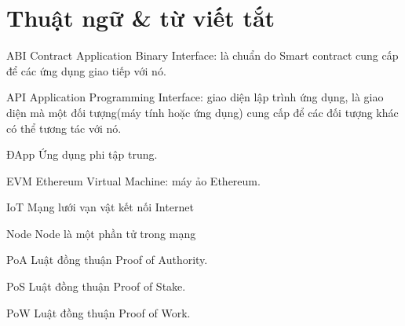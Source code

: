 \newcommand{\abbrlabel}[1]{\makebox[3cm][l]{\textbf{#1}\ \dotfill}}
\newenvironment{abbreviations}{\begin{list}{}{\renewcommand{\makelabel}{\abbrlabel}}}{\end{list}}

\chapter*{Thuật ngữ \& từ viết tắt}
\thispagestyle{empty}
\pagestyle{empty}
\vspace{1.0cm}
\begin{abbreviations}
	\item[ABI] Contract Application Binary Interface: là chuẩn do Smart contract cung cấp để các ứng dụng giao tiếp với nó.
    \item[API] Application Programming Interface: giao diện lập trình ứng dụng, là giao diện mà một đối tượng(máy tính hoặc ứng dụng) cung cấp để các đối tượng khác có thể tương tác với nó. 
    \item[ĐApp] Ứng dụng phi tập trung.
    \item[EVM] Ethereum Virtual Machine: máy ảo Ethereum.
    \item[IoT] Mạng lưới vạn vật kết nối Internet
	\item[Node] Node là một phần tử trong mạng
	\item[PoA] Luật đồng thuận Proof of Authority.
	\item[PoS] Luật đồng thuận Proof of Stake.
	\item[PoW] Luật đồng thuận Proof of Work.
\end{abbreviations}